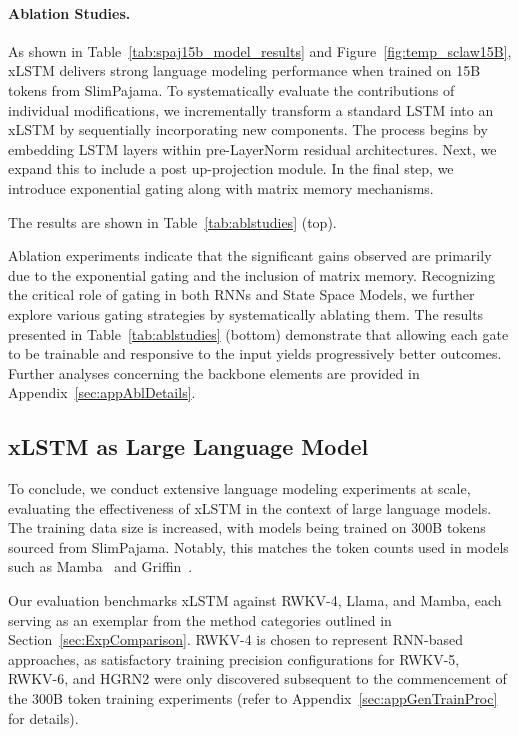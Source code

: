 \paragraph{Ablation Studies.}
As shown in Table~\ref{tab:spaj15b_model_results} and Figure~\ref{fig:temp_sclaw15B}, xLSTM delivers strong language modeling performance when trained on 15B tokens from SlimPajama. To systematically evaluate the contributions of individual modifications, we incrementally transform a standard LSTM into an xLSTM by sequentially incorporating new components. The process begins by embedding LSTM layers within pre-LayerNorm residual architectures. Next, we expand this to include a post up-projection module. In the final step, we introduce exponential gating along with matrix memory mechanisms.

The results are shown in Table~\ref{tab:ablstudies} (top). 

Ablation experiments indicate that the significant gains observed are primarily due to the exponential gating and the inclusion of matrix memory. Recognizing the critical role of gating in both RNNs and State Space Models, we further explore various gating strategies by systematically ablating them. The results presented in Table~\ref{tab:ablstudies} (bottom) demonstrate that allowing each gate to be trainable and responsive to the input yields progressively better outcomes. Further analyses concerning the backbone elements are provided in Appendix~\ref{sec:appAblDetails}.

\subsection{xLSTM as Large Language Model}
\label{sec:ExpLanguage}

To conclude, we conduct extensive language modeling experiments at scale, evaluating the effectiveness of xLSTM in the context of large language models. The training data size is increased, with models being trained on 300B tokens sourced from SlimPajama. Notably, this matches the token counts used in models such as Mamba~\citep{Gu:24arxiv} and Griffin~\citep{De:24arxiv}.

Our evaluation benchmarks xLSTM against RWKV-4, Llama, and Mamba, each serving as an exemplar from the method categories outlined in Section~\ref{sec:ExpComparison}. RWKV-4 is chosen to represent RNN-based approaches, as satisfactory training precision configurations for RWKV-5, RWKV-6, and HGRN2 were only discovered subsequent to the commencement of the 300B token training experiments (refer to Appendix~\ref{sec:appGenTrainProc} for details).

